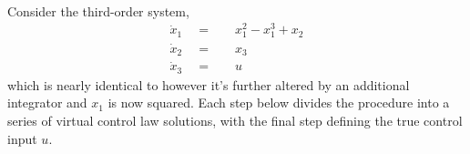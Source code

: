 \documentclass[12pt]{ucthesis}
\begin{document}
\begin{eg} \alignright \citet[Ex. 13.7]{Khalil1996} \label{eg: bs_rec}\\
	\indent Consider the third-order system,
		\begin{subequations}%
			\label{eq: bs_ex3_sys}%
			\begin{align}%
				\label{eq: bs_ex3_sysa} \dot{x}_1 \quad =& \quad x_1^2 - x_1^3 + x_2 \\
				\label{eq: bs_ex3_sysb} \dot{x}_2 \quad =& \quad x_3 \\
				\label{eq: bs_ex3_sysc} \dot{x}_3 \quad =& \quad u
			\end{align}%
		\end{subequations}%
	which is nearly identical to  however it's further altered by an additional integrator and $x_1$ is now squared. Each step below divides the procedure into a series of virtual control law solutions, with the final step defining the true control input $u$.
	

\end{eg}
\end{document}
